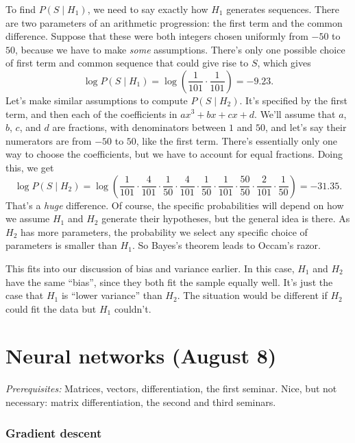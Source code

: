 \documentclass[11pt,paper=letter]{scrartcl}
\begin{document}
To find $P(S \mid H_1)$, we need to say exactly how $H_1$ generates sequences. There are two parameters of an arithmetic progression: the first term and the common difference. Suppose that these were both integers chosen uniformly from $-50$ to $50$, because we have to make \textit{some} assumptions. There's only one possible choice of first term and common sequence that could give rise to $S$, which gives
\[
  \log P(S \mid H_1) = \log \left(\frac{1}{101} \cdot \frac{1}{101}\right) = -9.23.
\]
Let's make similar assumptions to compute $P(S \mid H_2)$. It's specified by the first term, and then each of the coefficients in $ax^3 + bx + cx + d$. We'll assume that $a$, $b$, $c$, and $d$ are fractions, with denominators between $1$ and $50$, and let's say their numerators are from $-50$ to $50$, like the first term. There's essentially only one way to choose the coefficients, but we have to account for equal fractions. Doing this, we get
\[
  \log P(S \mid H_2) = \log \left(\frac{1}{101} \cdot \frac{4}{101} \cdot \frac{1}{50} \cdot \frac{4}{101} \cdot \frac{1}{50} \cdot \frac{1}{101} \cdot \frac{50}{50} \cdot \frac{2}{101} \cdot \frac{1}{50}\right)
  = -31.35.
\]
That's a \textit{huge} difference. Of course, the specific probabilities will depend on how we assume $H_1$ and $H_2$ generate their hypotheses, but the general idea is there. As $H_2$ has more parameters, the probability we select any specific choice of parameters is smaller than $H_1$. So Bayes's theorem leads to Occam's razor.

This fits into our discussion of bias and variance earlier. In this case, $H_1$ and $H_2$ have the same ``bias'', since they both fit the sample equally well. It's just the case that $H_1$ is ``lower variance'' than $H_2$. The situation would be different if $H_2$ could fit the data but $H_1$ couldn't.

\clearpage

\section{Neural networks (August 8)}

\textit{Prerequisites:} Matrices, vectors, differentiation, the first seminar. Nice, but not necessary: matrix differentiation, the second and third seminars.

\subsubsection*{Gradient descent}
\end{document}
